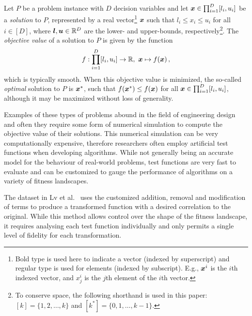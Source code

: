 \documentclass[journal]{IEEEtran}
\begin{document}
Let $P$ be a problem instance with $D$ decision variables and let $\boldsymbol{x} \in \prod^D_{i=1}[l_i,u_i]$ be a \emph{solution} to $P$, represented by a real vector\footnote{Bold type is used here to indicate a vector (indexed by superscript) and regular type is used for elements (indexed by subscript). E.g., $\boldsymbol{x}^i$ is the $i$th indexed vector, and $x_j^i$ is the $j$th element of the $i$th vector.} $\boldsymbol{x}$ such that $l_i \le x_i \le u_i$ for all ${i \in [D]}$, where $\boldsymbol{l},\boldsymbol{u} \in \mathbb{R}^D$ are the lower- and upper-bounds, respectively\footnote{To conserve space, the following shorthand is used in this paper: ${[k] = \{1,2,\dots,k\}}$ and $[k^*] = \{0,1,\dots,k-1\}$.}. The \emph{objective value} of a solution to $P$ is given by the function
\begin{equation}
f:\displaystyle\prod^D_{i=1}[l_i,u_i]\to \mathbb{R},\ \boldsymbol{x} \mapsto f(\boldsymbol{x})\,, \label{eq:objective}
\end{equation}
which is typically smooth. When this objective value is minimized, the so-called \emph{optimal} solution to $P$ is $\boldsymbol{x}^*$, such that $f(\boldsymbol{x}^*) \leq f(\boldsymbol{x})$ for all $\boldsymbol{x} \in \prod^D_{i=1}[l_i,u_i]$, although it may be maximized without loss of generality.

Examples of these types of problems abound in the field of engineering design~\cite{deb2012optimization,forrester2008engineering} and often they require some form of numerical simulation to compute the objective value of their solutions. This numerical simulation can be very computationally expensive, therefore researchers often employ artificial test functions when developing algorithms. While not generally being an accurate model for the behaviour of real-world problems, test functions are very fast to evaluate and can be customized to gauge the performance of algorithms on a variety of fitness landscapes.


The dataset in Lv et al.~\cite{lv2021multi} uses the customized addition, removal and modification of terms to produce a transformed function with a desired correlation to the original.
While this method allows control over the shape of the fitness landscape, it requires analysing each test function individually and only permits a single level of fidelity for each transformation.
\end{document}
